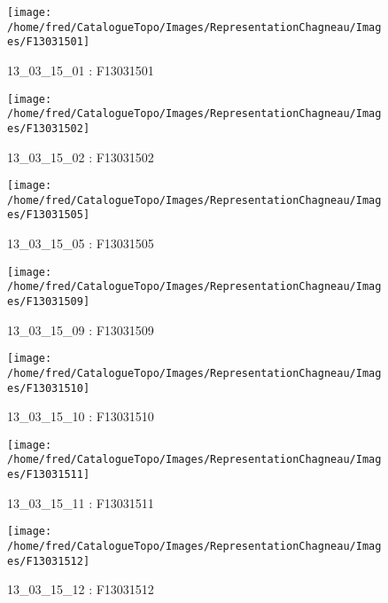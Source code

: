 \documentclass[12pt,titlepage,oneside]{book}
\begin{document}
\begin{figure}[h!]
  \hfill         %
  \begin{minipage}[t]{3cm}
    \begin{center}
      \texttt{[image: /home/fred/CatalogueTopo/Images/RepresentationChagneau/Images/F13031501]}
      \caption[F13031501]{\label{} 13\_03\_15\_01 : F13031501}
    \end{center}
  \end{minipage}
  \begin{minipage}[t]{3cm}
    \begin{center}
      \texttt{[image: /home/fred/CatalogueTopo/Images/RepresentationChagneau/Images/F13031502]}
      \caption[F13031502]{\label{} 13\_03\_15\_02 : F13031502}
    \end{center}
  \end{minipage}
  \begin{minipage}[t]{3cm}
    \begin{center}
      \texttt{[image: /home/fred/CatalogueTopo/Images/RepresentationChagneau/Images/F13031505]}
      \caption[F13031505]{\label{} 13\_03\_15\_05 : F13031505}
    \end{center}
  \end{minipage}
  \begin{minipage}[t]{3cm}
    \begin{center}
      \texttt{[image: /home/fred/CatalogueTopo/Images/RepresentationChagneau/Images/F13031509]}
      \caption[F13031509]{\label{} 13\_03\_15\_09 : F13031509}
    \end{center}
  \end{minipage}
  \begin{minipage}[t]{3cm}
    \begin{center}
      \texttt{[image: /home/fred/CatalogueTopo/Images/RepresentationChagneau/Images/F13031510]}
      \caption[F13031510]{\label{} 13\_03\_15\_10 : F13031510}
    \end{center}
  \end{minipage}
  \begin{minipage}[t]{3cm}
    \begin{center}
      \texttt{[image: /home/fred/CatalogueTopo/Images/RepresentationChagneau/Images/F13031511]}
      \caption[F13031511]{\label{} 13\_03\_15\_11 : F13031511}
    \end{center}
  \end{minipage}
  \begin{minipage}[t]{3cm}
    \begin{center}
      \texttt{[image: /home/fred/CatalogueTopo/Images/RepresentationChagneau/Images/F13031512]}
      \caption[F13031512]{\label{} 13\_03\_15\_12 : F13031512}
    \end{center}
  \end{minipage}
\end{figure}
\end{document}
